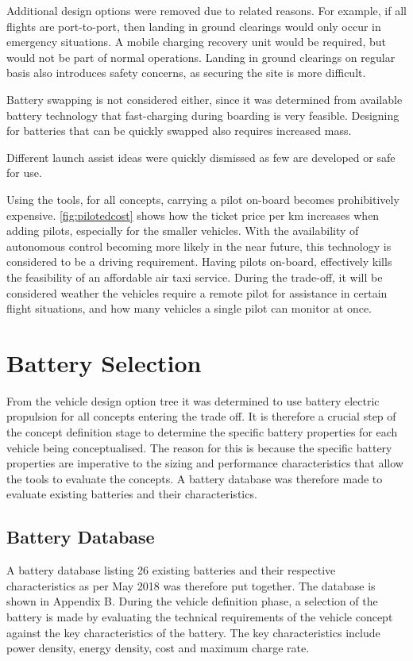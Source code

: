 Additional design options were removed due to related reasons. For example, if all flights are port-to-port, then landing in ground clearings would only occur in emergency situations. A mobile charging recovery unit would be required, but would not be part of normal operations. Landing in ground clearings on regular basis also introduces safety concerns, as securing the site is more difficult.

Battery swapping is not considered either, since it was determined from available battery technology that fast-charging during boarding is very feasible. Designing for batteries that can be quickly swapped also requires increased mass.

Different launch assist ideas were quickly dismissed as few are developed or safe for use.

Using the tools, for all concepts, carrying a pilot on-board becomes prohibitively expensive. \autoref{fig:pilotedcost} shows how the ticket price per km increases when adding pilots, especially for the smaller vehicles. With the availability of autonomous control becoming more likely in the near future, this technology is considered to be a driving requirement. Having pilots on-board, effectively kills the feasibility of an affordable air taxi service. During the trade-off, it will be considered weather the vehicles require a remote pilot for assistance in certain flight situations, and how many vehicles a single pilot can monitor at once.



\section{Battery Selection}
 From the vehicle design option tree it was determined to use battery electric propulsion for all concepts entering the trade off. It is therefore a crucial step of the concept definition stage to determine the specific battery properties for each vehicle being conceptualised. The reason for this is because the specific battery properties are imperative to the sizing and performance characteristics that allow the tools to evaluate the concepts. A battery database was therefore made to evaluate existing batteries and their characteristics.

 \subsection{Battery Database}
 A battery database listing 26 existing batteries and their respective characteristics as per May 2018 was therefore put together. The database is shown in Appendix B. During the vehicle definition phase, a selection of the battery is made by evaluating the technical requirements of the vehicle concept against the key characteristics of the battery. The key characteristics include power density, energy density, cost and maximum charge rate. 
